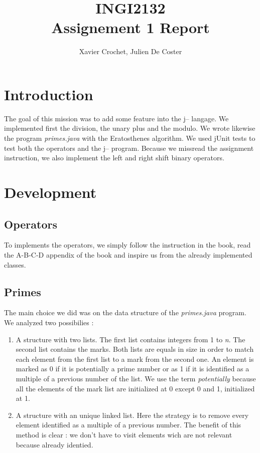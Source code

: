\documentclass[10pt,a4paper]{article}
\author{Xavier Crochet, Julien De Coster}
\title{INGI2132 \\ Assignement 1 Report}
\begin{document}
\maketitle

\section{Introduction}
The goal of this mission was to add some feature into the j-- langage. We implemented first the division, the unary plus and the modulo. We wrote likewise the program \emph{primes.java} with the Eratosthenes algorithm. We used jUnit tests to test both the operators and the j-- program. Because we missread the assignment instruction, we also implement the left and right shift binary operators. 

\section{Development}
\subsection{Operators}

To implements the operators, we simply follow the instruction in the book, read the A-B-C-D appendix of the book and inspire us from the already implemented classes. 

\subsection{Primes}
The main choice we did was on the data structure of the \emph{primes.java} program. We analyzed two possibilies :

\begin{enumerate}
\item{A structure with two lists. The first list contains integers from 1 to \emph{n}. The second list contains the marks. Both lists are equals in size in order to match each element from the first list to a mark from the second one. An element is marked as 0 if it is potentially a prime number or as 1 if it is identified as a multiple of a previous number of the list. We use the term \emph{potentially} because all the elements of the mark list are initialized at 0 except 0 and 1, initialized at 1.}

\item {A structure with an unique linked list. Here the strategy is to remove every element identified as a multiple of a previous number. The benefit of this method is clear : we don't have to visit elements wich are not relevant because already identied.}
\end{enumerate}
\end{document}
